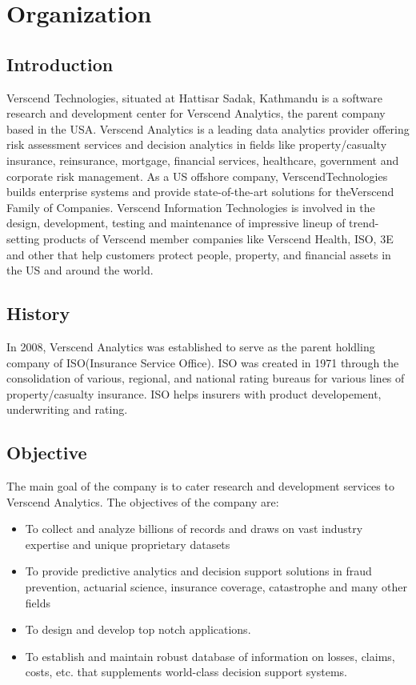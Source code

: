 \section{Organization}
\subsection{Introduction}
Verscend Technologies, situated at Hattisar Sadak, Kathmandu is a software research and development center for Verscend Analytics, the parent company based in the USA. Verscend Analytics is a leading data analytics provider offering risk assessment services and decision analytics in fields like property/casualty insurance, reinsurance, mortgage, financial services, healthcare, government and corporate risk management. As a US offshore company, VerscendTechnologies builds enterprise systems and provide state-of-the-art solutions for theVerscend Family of Companies. Verscend Information Technologies is involved in the design, development, testing and maintenance of impressive lineup of trend-setting products of Verscend member companies like Verscend Health, ISO, 3E and other that help customers protect people, property, and financial assets in the US and around the world.
\subsection{History}
In 2008, Verscend Analytics was established to serve as the parent holdling company of ISO(Insurance Service Office). ISO was created in 1971 through the consolidation of various, regional, and national rating bureaus for various lines of property/casualty insurance. ISO helps insurers with product developement, underwriting and rating.
\subsection{Objective}
The main goal of the company is to cater research and development services to Verscend Analytics. The
objectives of the company are:
\begin{itemize}
\item To collect and analyze billions of records and draws on vast industry expertise and unique proprietary
datasets
\item To provide predictive analytics and decision support solutions in fraud prevention, actuarial science,
insurance coverage, catastrophe and many other fields
\item To design and develop top notch applications.
\item To establish and maintain robust database of information on losses, claims, costs, etc. that supplements
world-class decision support systems.
\end{itemize}
